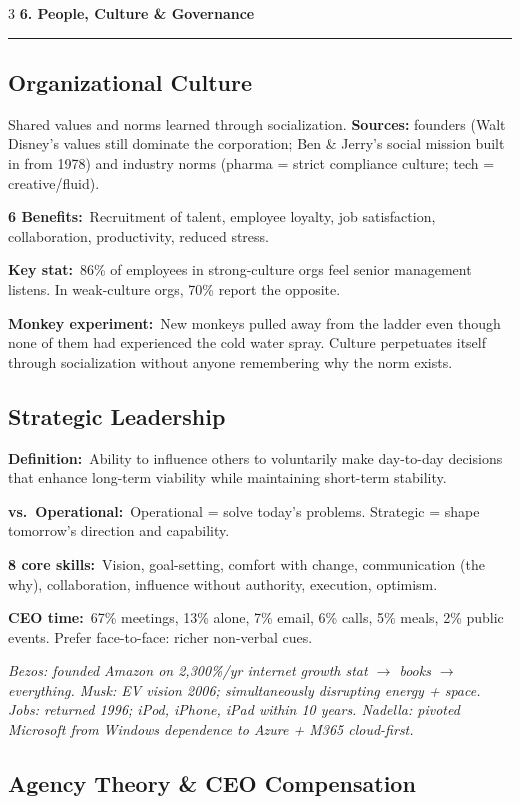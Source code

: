 \documentclass[7.6pt,letterpaper]{article}
\newcommand{\secbar}[1]{%
    \vspace{2pt}\noindent\textbf{#1}\par\vspace{1pt}\hrule\vspace{2pt}%
  }
\newcommand{\secbar}[1]{%
    \vspace{3pt}%
    \noindent\colorbox{navy}{\parbox{\dimexpr\linewidth-2\fboxsep}{%
      \fontsize{6.8pt}{8pt}\sffamily\bfseries\color{white}\strut\ #1\strut}}%
    \vspace{1pt}\par%
  }
\newcommand{\T}[1]{\textbf{\color{navy}#1}}
\newcommand{\kk}[2]{\noindent\T{#1}\ #2\par}
\newcommand{\eg}[1]{\textit{\color{mid}#1}}
\begin{document}
\begin{multicols}{3}
\secbar{6. People, Culture \& Governance}

\subsection{Organizational Culture}

Shared values and norms learned through socialization. \T{Sources:} founders (Walt Disney's values still dominate the corporation; Ben \& Jerry's social mission built in from 1978) and industry norms (pharma = strict compliance culture; tech = creative/fluid).

\kk{6 Benefits:}{Recruitment of talent, employee loyalty, job satisfaction, collaboration, productivity, reduced stress.}
\kk{Key stat:}{86\% of employees in strong-culture orgs feel senior management listens. In weak-culture orgs, 70\% report the opposite.}
\kk{Monkey experiment:}{New monkeys pulled away from the ladder even though none of them had experienced the cold water spray. Culture perpetuates itself through socialization without anyone remembering why the norm exists.}

\subsection{Strategic Leadership}

\kk{Definition:}{Ability to influence others to voluntarily make day-to-day decisions that enhance long-term viability while maintaining short-term stability.}
\kk{vs.\ Operational:}{Operational = solve today's problems. Strategic = shape tomorrow's direction and capability.}
\kk{8 core skills:}{Vision, goal-setting, comfort with change, communication (the why), collaboration, influence without authority, execution, optimism.}
\kk{CEO time:}{67\% meetings, 13\% alone, 7\% email, 6\% calls, 5\% meals, 2\% public events. Prefer face-to-face: richer non-verbal cues.}

\eg{Bezos: founded Amazon on 2,300\%/yr internet growth stat $\to$ books $\to$ everything. Musk: EV vision 2006; simultaneously disrupting energy + space. Jobs: returned 1996; iPod, iPhone, iPad within 10 years. Nadella: pivoted Microsoft from Windows dependence to Azure + M365 cloud-first.}

\subsection{Agency Theory \& CEO Compensation}


\end{multicols}
\end{document}
